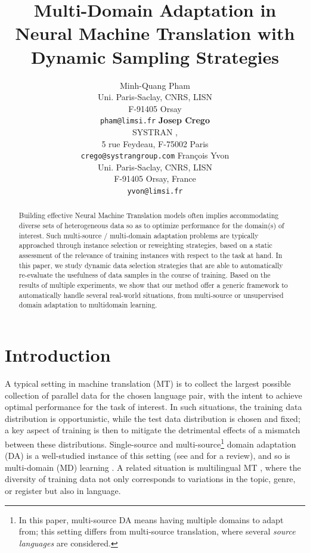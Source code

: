 \documentclass[11pt]{article}
\title{Multi-Domain Adaptation in Neural Machine Translation with Dynamic Sampling Strategies}
\author{Minh-Quang Pham\\
  Uni. Paris-Saclay,  CNRS, LISN \\
  F-91405 Orsay \\
  {\tt pham@limsi.fr}  \And
  \textbf{Josep Crego}\\
  SYSTRAN ,\\
  5 rue Feydeau, F-75002 Paris\\
  {\tt crego@systrangroup.com} \And
  Fran\c cois Yvon\\
  Uni. Paris-Saclay, CNRS, LISN\\
  F-91405 Orsay, France\\
  {\tt yvon@limsi.fr}}
\date{}
\newcommand{\fyDone}[1]{\done[FY]\Todo[FY:]{\textcolor{orange}{#1}}}
\newcommand{\revision}[1]{\textcolor{red}{#1}}
\begin{document}
\maketitle
\setlength{\abovedisplayskip}{2pt}
\setlength{\belowdisplayskip}{2pt}
\begin{abstract}
  Building effective Neural Machine Translation models often implies accommodating diverse sets of heterogeneous data so as to optimize performance for the domain(s) of interest. Such multi-source / multi-domain adaptation problems are typically approached through instance selection or reweighting strategies, based on a static assessment of the relevance of training instances with respect to the task at hand. In this paper, we study dynamic data selection strategies that are able to automatically re-evaluate the usefulness of data samples
  in the course of training. Based on the results of multiple experiments, we show that our method offer a generic framework to automatically
  handle several real-world situations, from multi-source or unsupervised domain adaptation to multidomain learning.
\end{abstract}

\section{Introduction}\label{sec:intro}
A typical setting in machine translation (MT) is to collect the largest possible collection of parallel data for the chosen language pair, with the intent to achieve optimal performance for the task of interest. In such situations, the training data distribution is opportunistic, while the test data distribution is chosen and fixed; a key aspect of training is then to mitigate the detrimental effects of a mismatch between these distributions. Single-source and multi-source\footnote{In this paper, multi-source DA means having multiple domains to adapt from; this setting differs from multi-source translation, where several \emph{source languages} are considered.} domain adaptation (DA) is a well-studied instance of this setting (see  and  for a review), and so is multi-domain (MD) learning \cite{Chu18multilingual,Jiang19multidomain,Pham21revisiting}. A related situation is multilingual MT \cite{Firat16multiway,Ha16towards,Johnson17google,Aharoni19massively},\fyDone{Fix ref}
where the diversity of training data not only corresponds to variations in the topic, genre, or register but also in language.
\end{document}
